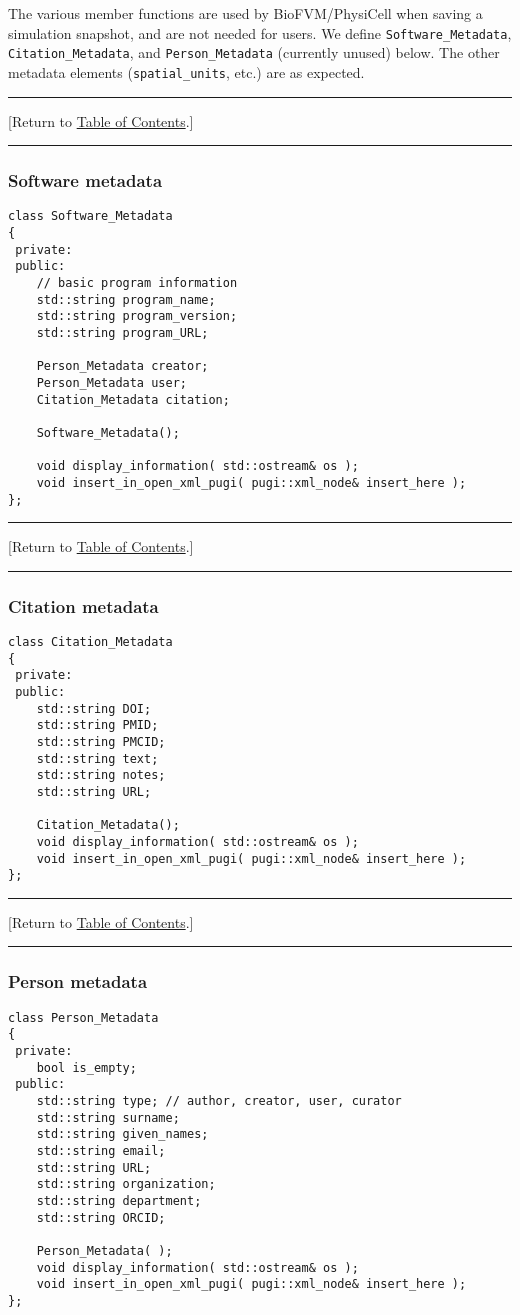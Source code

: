 \documentclass[12pt]{article}
\renewcommand{\v}{\verb}
\newcommand{\TOClink}{\begin{center}\hrule\vskip-5pt\phantom{.}\hfill[Return to \hyperlink{TOC}{Table of Contents}.]\hfill\phantom{.}\vskip3pt\hrule\end{center}}
\begin{document}
The various member functions are used by BioFVM/PhysiCell when saving a simulation 
snapshot, and are not needed for users.  
We define \v|Software_Metadata|, \v|Citation_Metadata|, 
and \v|Person_Metadata| (currently unused) below. The other metadata elements 
(\v|spatial_units|, etc.) are as expected. 

\TOClink 

\subsubsection{Software metadata}
\begin{verbatim}
class Software_Metadata
{
 private:
 public:
    // basic program information   
    std::string program_name; 
    std::string program_version; 
    std::string program_URL;
        
    Person_Metadata creator; 
    Person_Metadata user; 
    Citation_Metadata citation;
    
    Software_Metadata();
    
    void display_information( std::ostream& os ); 
    void insert_in_open_xml_pugi( pugi::xml_node& insert_here );         
};
\end{verbatim}

\TOClink 

\subsubsection{Citation metadata}
\begin{verbatim}
class Citation_Metadata
{
 private:
 public:
    std::string DOI;
    std::string PMID;
    std::string PMCID; 
    std::string text;
    std::string notes; 
    std::string URL; 
    
    Citation_Metadata();  
    void display_information( std::ostream& os );  
    void insert_in_open_xml_pugi( pugi::xml_node& insert_here );    
};
\end{verbatim}

\TOClink 

\subsubsection{Person metadata}
\begin{verbatim}
class Person_Metadata
{
 private: 
    bool is_empty; 
 public: 
    std::string type; // author, creator, user, curator 
    std::string surname;
    std::string given_names; 
    std::string email;
    std::string URL; 
    std::string organization; 
    std::string department; 
    std::string ORCID; 
    
    Person_Metadata( ); 
    void display_information( std::ostream& os );          
    void insert_in_open_xml_pugi( pugi::xml_node& insert_here );  
};
\end{verbatim}
\end{document}
